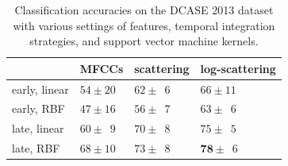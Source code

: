 \documentclass[journal]{IEEEtran}
\begin{document}
\begin{table}
\begin{center}
\caption{Classification accuracies on the DCASE 2013 dataset with various settings of features, temporal integration strategies, and support vector machine kernels.}
\begin{tabular}{llll}
             & MFCCs         & scattering & log-scattering  \\
             \hline
early, linear  & $54\pm20$   & $62\pm\phantom{0}6$  & $66\pm11$     \\
early, RBF     & $47\pm16$  & $56\pm\phantom{0}7$  & $63\pm\phantom{0}6$   \\
late, linear  & $60\pm\phantom{0}9$ & $70\pm\phantom{0}8$  & $75\pm\phantom{0}5$   \\
late, RBF     & $68\pm10$ & $73\pm\phantom{0}8$  & $\mathbf{78}\pm\phantom{0}6$   \\
\end{tabular}
\end{center}
\label{table:dcase2013}
\end{table}
\end{document}
